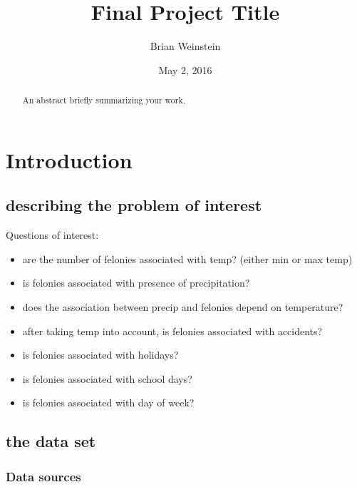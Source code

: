 \documentclass[12pt,notitlepage]{article}
\begin{document}
\title{Final Project Title}
\author{Brian Weinstein}
\date{May 2, 2016}

\maketitle



\begin{abstract}
\singlespacing
An abstract briefly summarizing your work.
\end{abstract}



\pagebreak

\singlespacing



\section{Introduction}


\subsection{describing the problem of interest}

Questions of interest:
\begin{itemize}
\item are the number of felonies associated with temp? (either min or max temp)
\item is felonies associated with presence of precipitation?
\item does the association between precip and felonies depend on temperature?
\item after taking temp into account, is felonies associated with accidents?
\item is felonies associated with holidays?
\item is felonies associated with school days?
\item is felonies associated with day of week?
\end{itemize}


\subsection{the data set}

\subsubsection{Data sources}
\end{document}
